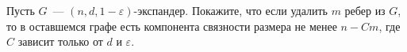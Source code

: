 Пусть $G$~--- $(n, d, 1 - \varepsilon)$-экспандер. Покажите, что если удалить $m$ ребер из $G$, то в оставшемся графе есть
компонента связности размера не менее $n - C m$, где $C$ зависит только от $d$ и $\varepsilon$.